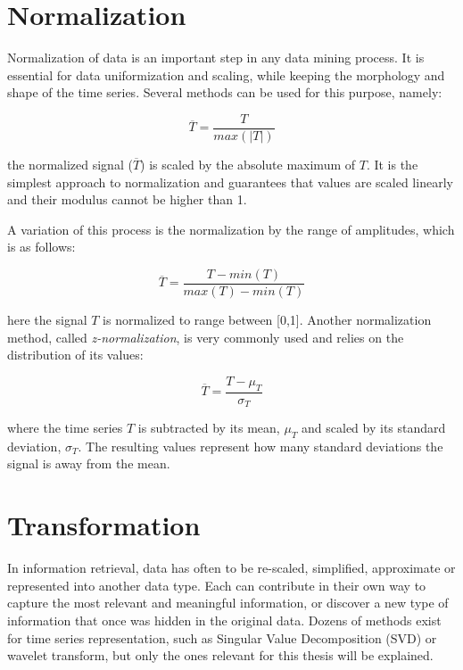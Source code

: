 \section{Normalization} 
\label{sec:normalize}

Normalization of data is an important step in any data mining process. It is essential for data uniformization and scaling, while keeping the morphology and shape of the time series. Several methods can be used for this purpose, namely:

\begin{equation}
\overline{T} = \frac{T}{max(|T|)}
\end{equation}

the normalized signal ($\overline{T}$) is scaled by the absolute maximum of $T$. It is the simplest approach to normalization and guarantees that values are scaled linearly and their modulus cannot be higher than 1.
\par
A variation of this process is the normalization by the range of amplitudes, which is as follows:

\begin{equation}
\overline{T} = \frac{T-min(T)}{max(T)-min(T)}
\end{equation}

here the signal $T$ is normalized to range between [0,1].
Another normalization method, called \textit{z-normalization}, is very commonly used and relies on the distribution of its values:

\begin{equation}
\overline{T} = \frac{T-\mu_T}{\sigma_T}
\end{equation}

where the time series $T$ is subtracted by its mean, $\mu_T$ and scaled by its standard deviation, $\sigma_T$. The resulting values represent how many standard deviations the signal is away from the mean.


\section{Transformation} 
\label{sec:transform}

In information retrieval, data has often to be re-scaled, simplified, approximate or represented into another data type. Each can contribute in their own way to capture the most relevant and meaningful information, or discover a new type of information that once was hidden in the original data. Dozens of methods exist for time series representation, such as Singular Value Decomposition (SVD) or wavelet transform, but only the ones relevant for this thesis will be explained.

